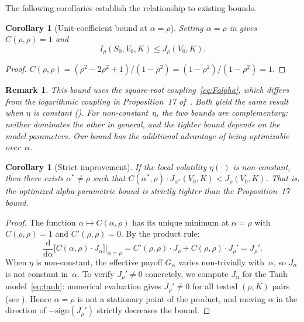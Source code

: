 \documentclass[12pt]{article}
\newtheorem{corollary}[theorem]{Corollary}
\newtheorem{remark}[theorem]{Remark}
\newcommand{\dd}{\mathrm{d}}
\begin{document}
The following corollaries establish the relationship to existing bounds.

\begin{corollary}[Unit-coefficient bound at $\alpha=\rho$]\label{cor:prop17}
Setting $\alpha=\rho$ in  gives $C(\rho,\rho)=1$ and
\[
I_\rho(S_0,V_0,K) \leq J_\rho(V_0,K).
\]
\end{corollary}
\begin{proof}
$C(\rho,\rho) = (\rho^2-2\rho^2+1)/(1-\rho^2) = (1-\rho^2)/(1-\rho^2) = 1$.
\end{proof}

\begin{remark}\label{rem:prop17compare}
This bound uses the square-root coupling~\eqref{eq:Falpha}, which differs from
the logarithmic coupling in Proposition~17 of~\cite{PWZ2025}. Both yield the same
result when $\eta$ is constant (). For non-constant~$\eta$,
the two bounds are complementary: neither dominates the other in general, and the
tighter bound depends on the model parameters. Our bound has the additional advantage
of being optimizable over~$\alpha$.
\end{remark}

\begin{corollary}[Strict improvement]\label{cor:strict}
If the local volatility $\eta(\cdot)$ is non-constant, then there exists $\alpha^*\neq\rho$
such that $C(\alpha^*,\rho)\cdot J_{\alpha^*}(V_0,K) < J_\rho(V_0,K)$. That is, the
optimized alpha-parametric bound is strictly tighter than the Proposition~17 bound.
\end{corollary}
\begin{proof}
The function $\alpha\mapsto C(\alpha,\rho)$ has its unique minimum at $\alpha=\rho$
with $C(\rho,\rho)=1$ and $C'(\rho,\rho)=0$. By the product rule:
\[
\frac{\dd}{\dd\alpha}\bigl[C(\alpha,\rho)\cdot J_\alpha\bigr]\bigg|_{\alpha=\rho}
  = C'(\rho,\rho)\cdot J_\rho + C(\rho,\rho)\cdot J_\rho'
  = J_\rho'.
\]
When $\eta$ is non-constant, the effective payoff $G_\alpha$ varies non-trivially
with~$\alpha$, so $J_\alpha$ is not constant in~$\alpha$. To verify $J_\rho'\neq 0$
concretely, we compute $J_\alpha$ for the Tanh model~\eqref{eq:tanh}: numerical
evaluation gives $J_\rho'\neq 0$ for all tested $(\rho,K)$ pairs (see
). Hence $\alpha=\rho$ is not a stationary point of the product,
and moving $\alpha$ in the direction of $-\mathrm{sign}(J_\rho')$ strictly decreases
the bound.
\end{proof}
\end{document}
